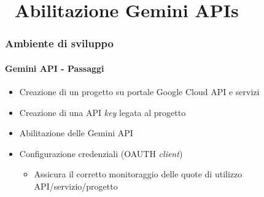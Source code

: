 \section{\faWrench\ Abilitazione Gemini APIs} %
\label{sec:diy-gemini-apis}
%
\begin{frame}[t,fragile] \frametitle{Ambiente di sviluppo}
\framesubtitle{Gemini API - Passaggi}
    \begin{itemize}
        \item[\alertedcircled{1}] Creazione di un progetto su portale Google Cloud API e servizi
        \item[\alertedcircled{2}] Creazione di una API \textit{key} legata al progetto
        \item[\alertedcircled{3}] Abilitazione delle Gemini API
        \item[\alertedcircled{4}] Configurazione credenziali (OAUTH \textit{client})
        \begin{itemize}[leftmargin=20pt,align=right]
			\item[\alert{\faArrowCircleRight}] Assicura il corretto monitoraggio delle quote di utilizzo API/servizio/progetto
        \end{itemize}
    \end{itemize}
\end{frame}
%
